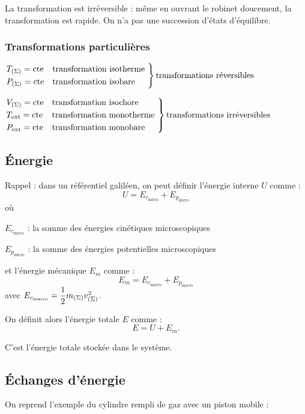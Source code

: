 La transformation est irréversible : même en ouvrant le robinet doucement, la transformation est rapide. On n'a pas une succession d'états d'équilibre.

\subsubsection{Transformations particulières}

\(\begin{drcases}
T_{\paren{\Sigma}}=\cte&\text{transformation isotherme } \\
P_{\paren{\Sigma}}=\cte&\text{transformation isobare}
\end{drcases}\text{transformations réversibles}\)

\(\begin{drcases}
V_{\paren{\Sigma}}=\cte&\text{transformation isochore} \\
T_{\ext}=\cte&\text{transformation monotherme } \\
P_\ext=\cte&\text{transformation monobare}
\end{drcases}\text{transformations irréversibles}\)

\subsection{Énergie}

Rappel : dans un référentiel galiléen, on peut définir l'énergie interne \(U\) comme : \[U=E_{c_\text{micro}}+E_{p_\text{micro}}\] où \begin{description}
\item \(E_{c_\text{micro}}\) : la somme des énergies cinétiques microscopiques
\item \(E_{p_\text{micro}}\) : la somme des énergies potentielles microscopiques\\
\end{description} et l'énergie mécanique \(E_m\) comme : \[E_m=E_{c_\text{macro}}+E_{p_\text{macro}}\] avec \(E_{c_\text{macro}}=\dfrac{1}{2}m_{\left(\Sigma\right)}v_{\left(\Sigma\right)}^2\).

On définit alors l'énergie totale \(E\) comme : \[E=U+E_m.\]

C'est l'énergie totale stockée dans le système.

\subsection{Échanges d'énergie}

On reprend l'exemple du cylindre rempli de gaz avec un piston mobile :


